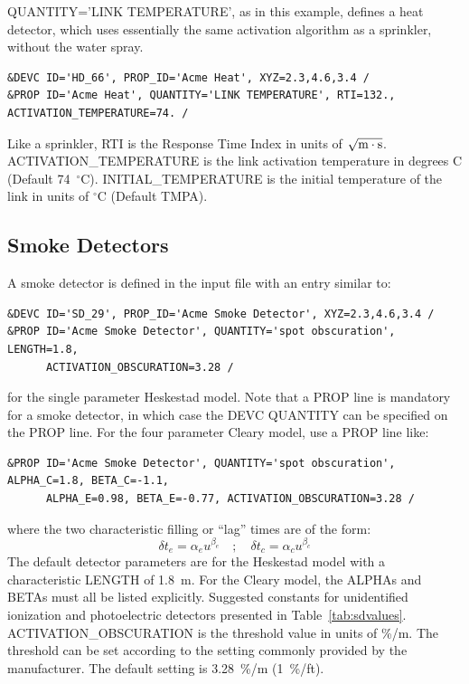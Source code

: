 \documentclass[11pt]{book}
\newcommand{\be}{\begin{equation}}
\newcommand{\ee}{\end{equation}}
\begin{document}
{\ct QUANTITY='LINK TEMPERATURE'}, as in this example, defines a heat detector, which uses essentially the same activation algorithm as a sprinkler, without the water spray.

\footnotesize
\begin{verbatim}
&DEVC ID='HD_66', PROP_ID='Acme Heat', XYZ=2.3,4.6,3.4 /
&PROP ID='Acme Heat', QUANTITY='LINK TEMPERATURE', RTI=132., ACTIVATION_TEMPERATURE=74. /
\end{verbatim}

\normalsize
\noindent
Like a sprinkler, {\ct RTI} is the Response Time Index in units of
$\sqrt{\hbox{m}\cdot \hbox{s}}$.
{\ct ACTIVATION\_TEMPERATURE} is the link activation temperature in degrees C (Default 74~$^\circ$C).
{\ct INITIAL\_TEMPERATURE} is the initial temperature of the link in units of $^\circ$C (Default {\ct TMPA}).



\subsection{Smoke Detectors}
\label{info:smoke_detector}

A smoke detector is defined in the input file with an entry similar to:

\footnotesize
\begin{verbatim}
&DEVC ID='SD_29', PROP_ID='Acme Smoke Detector', XYZ=2.3,4.6,3.4 /
&PROP ID='Acme Smoke Detector', QUANTITY='spot obscuration', LENGTH=1.8,
      ACTIVATION_OBSCURATION=3.28 /
\end{verbatim}

\normalsize
\noindent
for the single parameter Heskestad model. Note that a {\ct PROP} line is mandatory for a smoke detector, in which case the
{\ct DEVC QUANTITY} can be specified on the {\ct PROP} line. For the four parameter Cleary model, use a {\ct PROP} line like:

\footnotesize
\begin{verbatim}
&PROP ID='Acme Smoke Detector', QUANTITY='spot obscuration', ALPHA_C=1.8, BETA_C=-1.1,
      ALPHA_E=0.98, BETA_E=-0.77, ACTIVATION_OBSCURATION=3.28 /
\end{verbatim}

\normalsize
\noindent
where the two characteristic filling or ``lag'' times are of the form:
\be \delta t_e = \alpha_e u^{\beta_e} \quad ; \quad \delta t_c = \alpha_c u^{\beta_c} \ee
The default detector parameters are for the Heskestad model with a characteristic {\ct LENGTH} of
1.8~m. For the Cleary model, the {\ct ALPHA}s and {\ct BETA}s must all be listed explicitly.
Suggested constants for unidentified ionization and photoelectric detectors
presented in Table~\ref{tab:sdvalues}.
{\ct ACTIVATION\_OBSCURATION} is the threshold value in units of \%/m.
The threshold can be set according to the setting commonly provided by the manufacturer.
The default setting is 3.28~\%/m (1~\%/ft).
\end{document}
